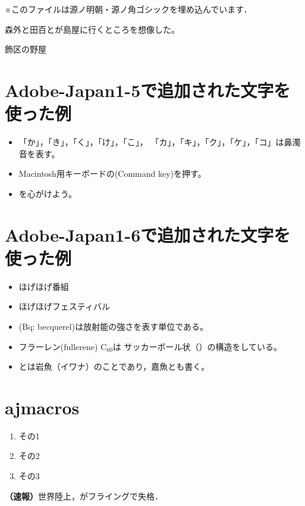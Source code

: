 \documentclass{ltjsarticle}
\begin{document}
※このファイルは源ノ明朝・源ノ角ゴシックを埋め込んでいます．

森外と田百とが島屋に行くところを想像した。

飾区の野屋

\section*{Adobe-Japan1-5で追加された文字を使った例}
\begin{itemize}
  \item 「\゜か」，「\゜き」，「\゜く」，「\゜け」，「\゜こ」，
        「\゜カ」，「\゜キ」，「\゜ク」，「\゜ケ」，「\゜コ」は鼻濁音を表す。
  \item Macintosh用キーボードの(Command key)を押す。
  \item {}を心がけよう。
\end{itemize}

\section*{Adobe-Japan1-6で追加された文字を使った例}
\begin{itemize}
  \item ほげほげ番組
  \item ほげほげフェスティバル
  \item {}(Bq: becquerel)は放射能の強さを表す単位である。
  \item フラーレン(fullerene) C$_{60}$は
        サッカーボール状（）の構造をしている。
  \item {}とは岩魚（イワナ）のことであり，嘉魚とも書く。
\end{itemize}

\section*{ajmacros}

\begin{enumerate}\renewcommand{\labelenumi}{\ajLabel\ajKuroKaku{enumi}}
\item その1
\item その2
\item その3
\end{enumerate}

{\bf（速報）}世界陸上，がフライングで失格．


%
\end{document}
